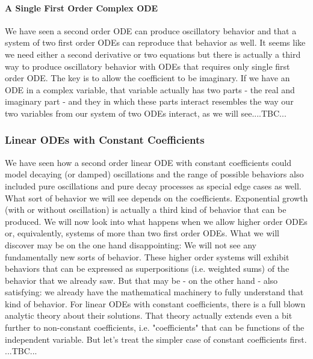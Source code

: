 
\paragraph{A Single First Order Complex ODE}
We have seen a second order ODE can produce oscillatory behavior and that a system of two first order ODEs can reproduce that behavior as well. It seems like we need either a second derivative or two equations but there is actually a third way to produce oscillatory behavior with ODEs that requires only single first order ODE. The key is to allow the coefficient to be imaginary. If we have an ODE in a complex variable, that variable actually has two parts - the real and imaginary part - and they in which these parts interact resembles the way our two variables from our system of two ODEs interact, as we will see....TBC...





\subsubsection{Linear ODEs with Constant Coefficients}
We have seen how a second order linear ODE with constant coefficients could model decaying (or damped) oscillations and the range of possible behaviors also included pure oscillations and pure decay processes as special edge cases as well. What sort of behavior we will see depends on the coefficients. Exponential growth (with or without oscillation) is actually a third kind of behavior that can be produced. We will now look into what happens when we allow higher order ODEs or, equivalently, systems of more than two first order ODEs. What we will discover may be on the one hand disappointing: We will not see any fundamentally new sorts of behavior. These higher order systems will exhibit behaviors that can be expressed as superpositions (i.e. weighted sums) of the behavior that we already saw. But that may be - on the other hand - also satisfying: we already have the mathematical machinery to fully understand that kind of behavior. For linear ODEs with constant coefficients, there is a full blown analytic theory about their solutions. That theory actually extends even a bit further to non-constant coefficients, i.e. "coefficients" that can be functions of the independent variable. But let's treat the simpler case of constant coefficients first. ...TBC...

